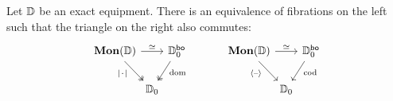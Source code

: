 \documentclass[11pt,oneside,article]{memoir}
\begin{document}
\begin{proposition}
      \label{prop:Mon_vs_bo}
   Let $\mathbb{D}$ be an exact equipment. There is an equivalence of fibrations on the left such
   that the triangle on the right also commutes:
   \begin{equation*}
      \begin{tikzcd}[column sep=0em]
         \Mon(\dcat{D}) \ar[rr,"\equiv"] \ar[dr,two heads,"\MOb"' pos=.3]
            && \dcat{D}_0^{\bo} \ar[dl,two heads,"\dom" pos=.3] \\
         & \dcat{D}_0 &
      \end{tikzcd}
      \qquad\quad
      \begin{tikzcd}[column sep=0em]
         \Mon(\dcat{D}) \ar[rr,"\equiv"] \ar[dr,"\ColDash"' pos=.3]
            && \dcat{D}_0^{\bo} \ar[dl,"\cod" pos=.3] \\
         & \dcat{D}_0 &
      \end{tikzcd}
   \end{equation*}
\end{proposition}
\end{document}
